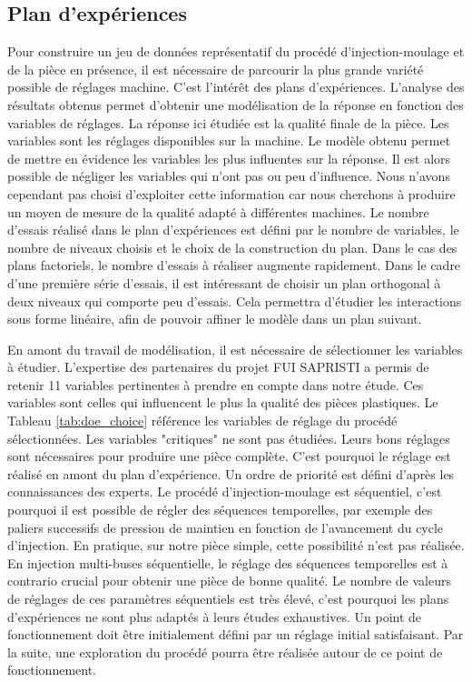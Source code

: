 \subsection{Plan d'expériences}
Pour construire un jeu de données représentatif du procédé d'injection-moulage et de la pièce en présence, il est nécessaire de parcourir la plus grande variété possible de réglages machine.
C'est l'intérêt des plans d'expériences.
L'analyse des résultats obtenus permet d'obtenir une modélisation de la réponse en fonction des variables de réglages.
La réponse ici étudiée est la qualité finale de la pièce.
Les variables sont les réglages disponibles sur la machine. Le modèle obtenu permet de mettre en évidence les variables les plus influentes sur la réponse.
Il est alors possible de négliger les variables qui n'ont pas ou peu d'influence.
Nous n'avons cependant pas choisi d'exploiter cette information car nous cherchons à produire un moyen de mesure de la qualité adapté à différentes machines.
Le nombre d'essais réalisé dans le plan d'expériences est défini par le nombre de variables, le nombre de niveaux choisis et le choix de la construction du plan.
Dans le cas des plans factoriels, le nombre d'essais à réaliser augmente rapidement.
Dans le cadre d'une première série d'essais, il est intéressant de choisir un plan orthogonal à deux niveaux qui comporte peu d'essais.
Cela permettra d'étudier les interactions sous forme linéaire, afin de pouvoir affiner le modèle dans un plan suivant.

En amont du travail de modélisation, il est nécessaire de sélectionner les variables à étudier.
L'expertise des partenaires du projet FUI SAPRISTI a permis de retenir 11 variables pertinentes à prendre en compte dans notre étude.
Ces variables sont celles qui influencent le plus la qualité des pièces plastiques. Le Tableau \ref{tab:doe_choice} référence les variables de réglage du procédé sélectionnées.
Les variables "critiques" ne sont pas étudiées.
Leurs bons réglages sont nécessaires pour produire une pièce complète.
C'est pourquoi le réglage est réalisé en amont du plan d'expérience. Un ordre de priorité est défini d'après les connaissances des experts.
Le procédé d'injection-moulage est séquentiel, c'est pourquoi il est possible de régler des séquences temporelles, par exemple des paliers successifs de pression de maintien en fonction de l'avancement du cycle d'injection.
En pratique, sur notre pièce simple, cette possibilité n'est pas réalisée.
En injection multi-buses séquentielle, le réglage des séquences temporelles est à contrario crucial pour obtenir une pièce de bonne qualité.
Le nombre de valeurs de réglages de ces paramètres séquentiels est très élevé, c'est pourquoi les plans d'expériences ne sont plus adaptés à leurs études exhaustives.
Un point de fonctionnement doit être initialement défini par un réglage initial satisfaisant.
Par la suite, une exploration du procédé pourra être réalisée autour de ce point de fonctionnement.

